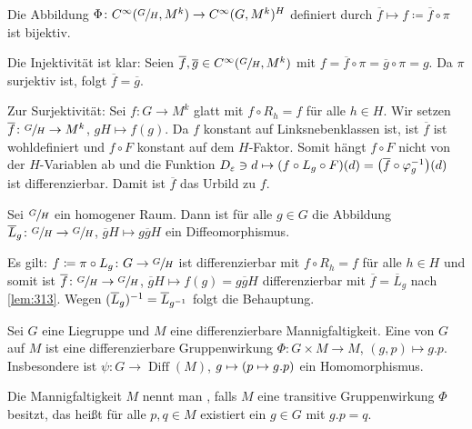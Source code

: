 \begin{lemma}[label=lem:313,{name=[Bijektion von Mengen glatter Abbildungen]}]
	Die Abbildung $\Phi \colon C^\infty(\sfrac{G}{H}, M^k) \to C^\infty(G,M^k)^H$ definiert durch $\overline{f} \mapsto f \coloneqq \overline{f} \circ \pi$ ist bijektiv. 
\end{lemma}
\begin{beweis}
	Die Injektivität ist klar: Seien $\overline{f},\overline{g} \in C^\infty(\sfrac{G}{H},M^k)$ mit $f=\overline{f} \circ \pi = \overline{g} \circ \pi = g$.
	Da $\pi$ surjektiv ist, folgt $\overline{f} = \overline{g}$.
	
	Zur Surjektivität: Sei $f \colon G \to M^k$ glatt mit $f \circ R_h = f$ für alle $h \in H$.
	Wir setzen $\overline{f} \colon \sfrac{G}{H} \to M^k$, $gH \mapsto f(g)$.
	Da $f$ konstant auf Linksnebenklassen ist, ist $\overline{f}$ ist wohldefiniert und $f \circ F$ konstant auf dem $H$-Faktor.
	Somit hängt $f \circ F$ nicht von der $H$-Variablen ab und die Funktion $D_\varepsilon \ni d \mapsto (f \circ L_g \circ F)(d) = \enbrace*{\overline{f} \circ \varphi_g^{-1}}(d)$ ist differenzierbar.
	Damit ist $\overline{f}$ das Urbild zu $f$.
\end{beweis}

\begin{korollar}[{name=[Linksmulitplikation Diffeomorphismus auf Quotienten]}]
	Sei $\sfrac{G}{H}$ ein homogener Raum.
	Dann ist für alle $g \in G$ die Abbildung $\overline{L}_g \colon \sfrac{G}{H} \to \sfrac{G}{H}$, $\overline{g}H \mapsto g \overline{g}H$ ein Diffeomorphismus.
\end{korollar}
\begin{beweis}
	Es gilt: $f \coloneqq \pi \circ L_g \colon G \to \sfrac{G}{H}$ ist differenzierbar mit $f \circ R_h = f$ für alle $h \in H$ und somit ist $\overline{f} \colon \sfrac{G}{H} \to \sfrac{G}{H}$, $\overline{g}H \mapsto f(g) = g \overline{g}H$ differenzierbar mit $\overline{f} = \overline{L}_g$ nach \autoref{lem:313}.
	Wegen $\enbrace{\overline{L}_g}^{-1} = \overline{L}_{g^{-1}}$  folgt die Behauptung.
\end{beweis}

\begin{definition}[{name=[Liegruppenwirkung und $G$-homogener Raum]}]
	Sei $G$ eine Liegruppe und $M$ eine differenzierbare Mannigfaltigkeit.
	Eine  von $G$ auf $M$ ist eine differenzierbare Gruppenwirkung $\Phi \colon G \times M \to M$, $(g,p) \mapsto g.p$.
	Insbesondere ist $\psi \colon G\to \operatorname{Diff}(M)$, $g \mapsto  \enbrace*{p \mapsto g.p}$ ein Homomorphismus.
	
	Die Mannigfaltigkeit $M$ nennt man , falls $M$ eine transitive Gruppenwirkung $\Phi$ besitzt, das heißt für alle $p,q \in M$ existiert ein $g \in G$ mit $g.p=q$.
\end{definition}

